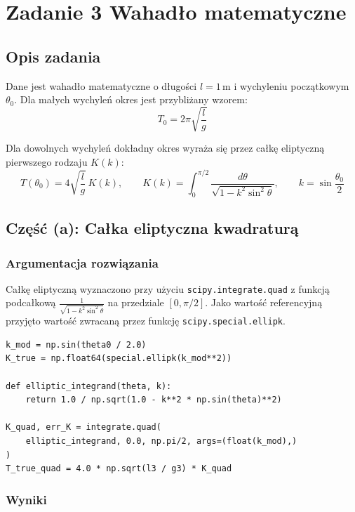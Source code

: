 \documentclass[12pt, a4paper]{article}
\begin{document}
\section{Zadanie 3 \textendash{} Wahadło matematyczne}

\subsection{Opis zadania}

Dane jest wahadło matematyczne o długości $l = 1\,\text{m}$ i wychyleniu początkowym $\theta_0$. Dla małych wychyleń okres jest przybliżany wzorem:
\[
  T_0 = 2\pi\sqrt{\frac{l}{g}}
\]

Dla dowolnych wychyleń dokładny okres wyraża się przez całkę eliptyczną pierwszego rodzaju $K(k)$:
\[
  T(\theta_0) = 4\sqrt{\frac{l}{g}}\,K(k), \qquad K(k) = \int_0^{\pi/2}\frac{d\theta}{\sqrt{1 - k^2\sin^2\theta}}, \qquad k = \sin\frac{\theta_0}{2}
\]

\subsection{Część (a): Całka eliptyczna kwadraturą}

\subsubsection{Argumentacja rozwiązania}

Całkę eliptyczną wyznaczono przy użyciu \texttt{scipy.integrate.quad} z funkcją podcałkową $\frac{1}{\sqrt{1-k^2\sin^2\theta}}$ na przedziale $[0, \pi/2]$. Jako wartość referencyjną przyjęto wartość zwracaną przez funkcję \texttt{scipy.special.ellipk}.

\begin{lstlisting}[caption={Obliczenie całki eliptycznej kwadraturą}]
k_mod = np.sin(theta0 / 2.0)
K_true = np.float64(special.ellipk(k_mod**2))

def elliptic_integrand(theta, k):
    return 1.0 / np.sqrt(1.0 - k**2 * np.sin(theta)**2)

K_quad, err_K = integrate.quad(
    elliptic_integrand, 0.0, np.pi/2, args=(float(k_mod),)
)
T_true_quad = 4.0 * np.sqrt(l3 / g3) * K_quad
\end{lstlisting}

\subsubsection{Wyniki}
\end{document}
